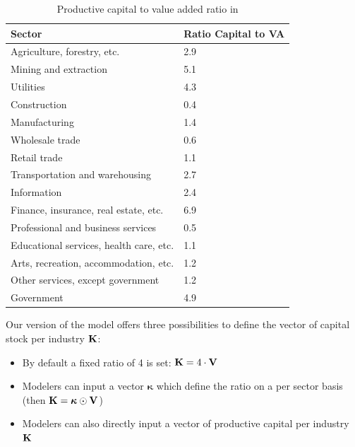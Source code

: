\begin{table}[h]
  \centering
  \begin{tabular}{@{}ll@{}}
    \toprule
    \textbf{Sector}                         & \textbf{Ratio Capital to VA} \\ \midrule
    Agriculture, forestry, etc.             & 2.9                          \\
    Mining and extraction                   & 5.1                          \\
    Utilities                               & 4.3                          \\
    Construction                            & 0.4                          \\
    Manufacturing                           & 1.4                          \\
    Wholesale trade                         & 0.6                          \\
    Retail trade                            & 1.1                          \\
    Transportation and warehousing          & 2.7                          \\
    Information                             & 2.4                          \\
    Finance, insurance, real estate, etc.   & 6.9                          \\
    Professional and business services      & 0.5                          \\
    Educational services, health care, etc. & 1.1                          \\
    Arts, recreation, accommodation, etc.   & 1.2                          \\
    Other services, except government       & 1.2                          \\
    Government                              & 4.9 \\
    \bottomrule
  \end{tabular}%
  \caption{Productive capital to value added ratio in \textcite{hallegatte-2013-model-role}}
  \label{tab:capital-va-ratio}
\end{table}

Our version of the model offers three possibilities to define the vector of
capital stock per industry $\mathbf{K}$:
\begin{itemize}
\item By default a fixed ratio of 4 is set: $\mathbf{K} = 4 \cdot \mathbf{V}$
\item Modelers can input a vector $\bm{\kappa}$ which define the ratio on a per
  sector basis (then $\mathbf{K} = \bm{\kappa} \odot \mathbf{V}$)
\item Modelers can also directly input a vector of productive capital per industry $\mathbf{K}$
\end{itemize}

